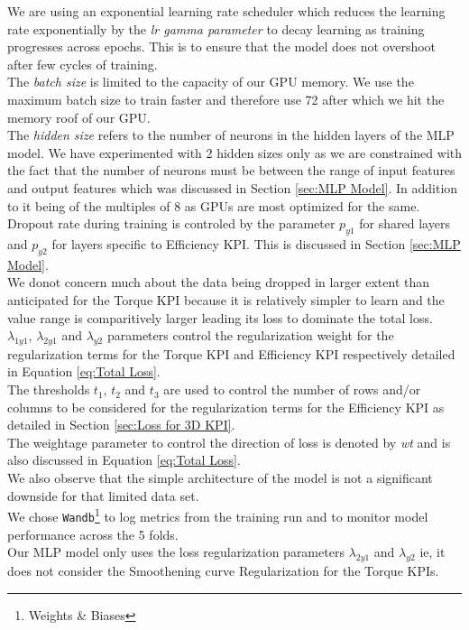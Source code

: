 \documentclass{report} %
\begin{document}
We are using an exponential learning rate scheduler which reduces the learning rate exponentially by the \textit{lr gamma parameter} to decay learning as training progresses across epochs.
This is to ensure that the model does not overshoot after few cycles of training.\\
The \textit{batch size} is limited to the capacity of our \ac{GPU} memory. We use the maximum batch size to train faster and therefore use 72 after which we hit the memory roof of our GPU.\\
The \textit{hidden size} refers to the number of neurons in the hidden layers of the \ac{MLP} model. 
We have experimented with 2 hidden sizes only as we are constrained with the fact that the number of neurons must be between the range of input features and output features which was discussed in Section \ref{sec:MLP Model}.
In addition to it being of the multiples of 8 as \ac{GPU}s are most optimized for the same.
Dropout rate during training is controled by the parameter \textit{$p_{y1}$} for shared layers and \textit{$p_{y2}$} for layers specific to Efficiency \ac{KPI}. This is discussed in Section \ref{sec:MLP Model}. \\
We donot concern much about the data being dropped in larger extent than anticipated for the Torque \ac{KPI} because it is relatively simpler to learn and the value range is comparitively larger leading its loss to dominate the total loss.\\
\textit{$\lambda_{1y1}$}, \textit{$\lambda_{2y1}$} and \textit{$\lambda_{y2}$} parameters control the regularization weight for the regularization terms for the Torque \ac{KPI} and Efficiency \ac{KPI} respectively detailed in Equation \ref{eq:Total Loss}.\\
The thresholds \textit{$t_{1}$}, \textit{$t_{2}$} and \textit{$t_{3}$} are used to control the number of rows and/or columns to be considered for the regularization terms for the Efficiency \ac{KPI} as detailed in Section \ref{sec:Loss for 3D KPI}.\\
The weightage parameter to control the direction of loss is denoted by \textit{wt} and is also discussed in Equation \ref{eq:Total Loss}.\\

We also observe that the simple architecture of the model is not a significant downside for that limited data set. \\

We chose \texttt{Wandb}\footnote{Weights \& Biases} to log metrics from the training run and to monitor model performance across the 5 folds. \\
Our \ac{MLP} model only uses the loss regularization parameters \textit{$\lambda_{2y1}$} and \textit{$\lambda_{y2}$} ie, it does not consider the Smoothening curve Regularization for the Torque \ac{KPI}s.
\end{document}
